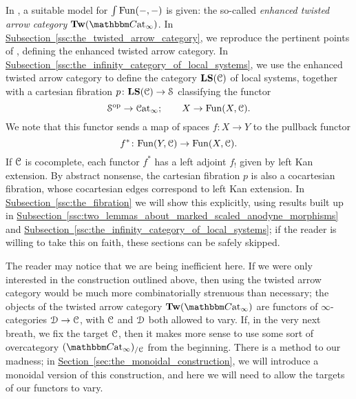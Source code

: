 \documentclass[main.tex]{subfiles}
\begin{document}
In \cite{garcia2020enhanced}, a suitable model for $\int\mathrm{Fun}(-, -)$ is given: the so-called \emph{enhanced twisted arrow category} $\Tw(\ICCat)$. In \hyperref[ssc:the_twisted_arrow_category]{Subsection~\ref*{ssc:the_twisted_arrow_category}}, we reproduce the pertinent points of \cite{garcia2020enhanced}, defining the enhanced twisted arrow category. In \hyperref[ssc:the_infinity_category_of_local_systems]{Subsection~\ref*{ssc:the_infinity_category_of_local_systems}}, we use the enhanced twisted arrow category to define the category $\mathbf{LS}(\mathcal{C})$ of local systems, together with a cartesian fibration $p\colon \mathbf{LS}(\mathcal{C}) \to \mathcal{S}$ classifying the functor
\begin{equation*}
  \mathcal{S}^{\mathrm{op}} \to \mathcal{C}\mathrm{at}_{\infty};\qquad X \to \mathrm{Fun}(X, \mathcal{C}).
\end{equation*}
We note that this functor sends a map of spaces $f\colon X \to Y$ to the pullback functor
\begin{equation*}
  f^{*}\colon \mathrm{Fun}(Y, \mathcal{C}) \to \mathrm{Fun}(X, \mathcal{C}).
\end{equation*}
If $\mathcal{C}$ is cocomplete, each functor $f^{*}$ has a left adjoint $f_{!}$ given by left Kan extension. By abstract nonsense, the cartesian fibration $p$ is also a cocartesian fibration, whose cocartesian edges correspond to left Kan extension. In \hyperref[ssc:the_fibration]{Subsection~\ref*{ssc:the_fibration}} we will show this explicitly, using results built up in \hyperref[ssc:two_lemmas_about_marked_scaled_anodyne_morphisms]{Subsection~\ref*{ssc:two_lemmas_about_marked_scaled_anodyne_morphisms}} and \hyperref[ssc:the_infinity_category_of_local_systems]{Subsection~\ref*{ssc:the_infinity_category_of_local_systems}}; if the reader is willing to take this on faith, these sections can be safely skipped.

\begin{note}
  The reader may notice that we are being inefficient here. If we were only interested in the construction outlined above, then using the twisted arrow category would be much more combinatorially strenuous than necessary; the objects of the twisted arrow category $\Tw(\ICCat)$ are functors of $\infty$-categories $\mathcal{D} \to \mathcal{C}$, with $\mathcal{C}$ and $\mathcal{D}$ both allowed to vary. If, in the very next breath, we fix the target $\mathcal{C}$, then it makes more sense to use some sort of overcategory $(\ICCat)_{/\category{C}}$ from the beginning. There is a method to our madness; in \hyperref[sec:the_monoidal_construction]{Section~\ref*{sec:the_monoidal_construction}}, we will introduce a monoidal version of this construction, and here we will need to allow the targets of our functors to vary.
\end{note}
\end{document}
